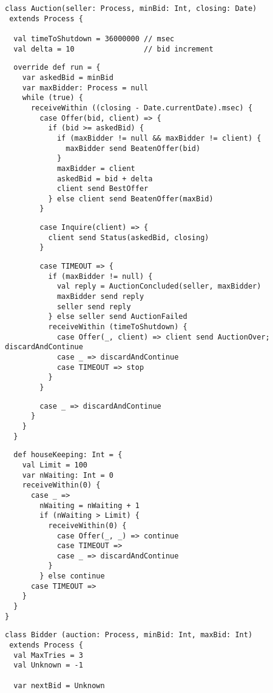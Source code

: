 \begin{lstlisting}
class Auction(seller: Process, minBid: Int, closing: Date)
 extends Process {

  val timeToShutdown = 36000000 // msec
  val delta = 10                // bid increment
\end{lstlisting}
\begin{lstlisting}
  override def run = {
    var askedBid = minBid
    var maxBidder: Process = null
    while (true) {
      receiveWithin ((closing - Date.currentDate).msec) {
        case Offer(bid, client) => {
          if (bid >= askedBid) {
            if (maxBidder != null && maxBidder != client) {
              maxBidder send BeatenOffer(bid)
            }
            maxBidder = client
            askedBid = bid + delta
            client send BestOffer
          } else client send BeatenOffer(maxBid)
        }
\end{lstlisting}
\begin{lstlisting}
        case Inquire(client) => {
          client send Status(askedBid, closing)
        }
\end{lstlisting}
\begin{lstlisting}
        case TIMEOUT => {
          if (maxBidder != null) {
            val reply = AuctionConcluded(seller, maxBidder)
            maxBidder send reply
            seller send reply
          } else seller send AuctionFailed
          receiveWithin (timeToShutdown) {
            case Offer(_, client) => client send AuctionOver; discardAndContinue
            case _ => discardAndContinue
            case TIMEOUT => stop
          }
        }
\end{lstlisting}
\begin{lstlisting}
        case _ => discardAndContinue
      }
    }
  }
\end{lstlisting}
\begin{lstlisting}
  def houseKeeping: Int = {
    val Limit = 100
    var nWaiting: Int = 0
    receiveWithin(0) {
      case _ =>
        nWaiting = nWaiting + 1
        if (nWaiting > Limit) {
          receiveWithin(0) {
            case Offer(_, _) => continue
            case TIMEOUT =>
            case _ => discardAndContinue
          }
        } else continue
      case TIMEOUT =>
    }
  }
}
\end{lstlisting}
\begin{lstlisting}
class Bidder (auction: Process, minBid: Int, maxBid: Int)
 extends Process {
  val MaxTries = 3
  val Unknown = -1

  var nextBid = Unknown
\end{lstlisting}
